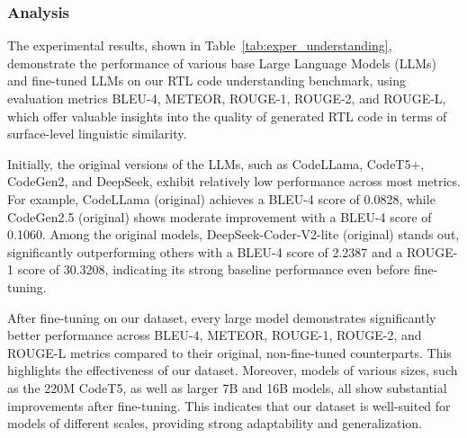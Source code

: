 \subsubsection{Analysis}


The experimental results, shown in Table~\ref{tab:exper_understanding}, demonstrate the performance of various base Large Language Models (LLMs) and fine-tuned LLMs on our RTL code understanding benchmark, using evaluation metrics BLEU-4, METEOR, ROUGE-1, ROUGE-2, and ROUGE-L, which offer valuable insights into the quality of generated RTL code in terms of surface-level linguistic similarity.




Initially, the original versions of the LLMs, such as CodeLLama, CodeT5+, CodeGen2, and DeepSeek, exhibit relatively low performance across most metrics. For example, CodeLLama (original) achieves a BLEU-4 score of 0.0828, while CodeGen2.5 (original) shows moderate improvement with a BLEU-4 score of 0.1060. Among the original models, DeepSeek-Coder-V2-lite (original) stands out, significantly outperforming others with a BLEU-4 score of 2.2387 and a ROUGE-1 score of 30.3208, indicating its strong baseline performance even before fine-tuning.

After fine-tuning on our dataset, every large model demonstrates significantly better performance across BLEU-4, METEOR, ROUGE-1, ROUGE-2, and ROUGE-L metrics compared to their original, non-fine-tuned counterparts. This highlights the effectiveness of our dataset. Moreover, models of various sizes, such as the 220M CodeT5, as well as larger 7B and 16B models, all show substantial improvements after fine-tuning. This indicates that our dataset is well-suited for models of different scales, providing strong adaptability and generalization.



